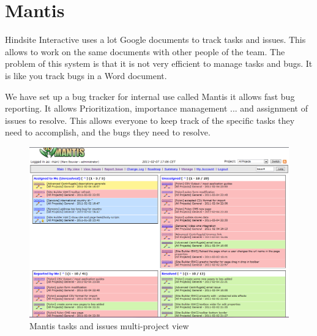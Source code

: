 \section{Mantis}
Hindsite Interactive uses a lot Google documents to track tasks and issues. This allows to work on the same documents with other people of the team. The problem of this system is that it is not very efficient to manage tasks and bugs. It is like you track bugs in a Word document.

We have set up a bug tracker for internal use called Mantis it allows fast bug reporting. It allows Prioritization, importance management ... and assignment of issues to resolve. This allows everyone to keep track of the specific tasks they need to accomplish, and the bugs they need to resolve.


\begin{figure}[!ht]
\centering
\includegraphics[width=.85\textwidth]{img/mantis.png}
\caption{Mantis tasks and issues multi-project view}
\label{figure:mantis}
\end{figure}
 

